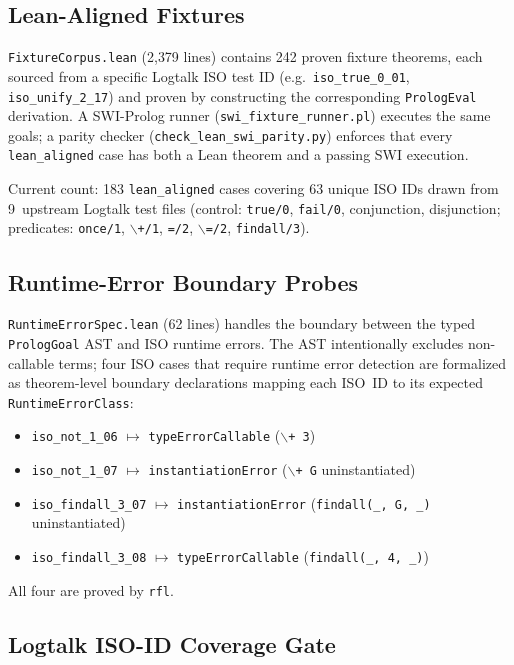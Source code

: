 \documentclass[]{article}
\newcommand{\code}[1]{\texttt{#1}}
\begin{document}
\subsection{Lean-Aligned Fixtures}

\code{FixtureCorpus.lean} (2{,}379 lines) contains 242 proven fixture
theorems, each sourced from a specific Logtalk ISO test ID
(e.g.\ \code{iso\_true\_0\_01}, \code{iso\_unify\_2\_17}) and proven
by constructing the corresponding \code{PrologEval} derivation.
A SWI-Prolog runner (\code{swi\_fixture\_runner.pl}) executes the same
goals; a parity checker (\code{check\_lean\_swi\_parity.py}) enforces
that every \code{lean\_aligned} case has both a Lean theorem and a
passing SWI execution.

Current count: 183 \code{lean\_aligned} cases covering 63 unique ISO IDs
drawn from 9~upstream Logtalk test files (control: \code{true/0},
\code{fail/0}, conjunction, disjunction; predicates: \code{once/1},
\code{$\backslash$+/1}, \code{=/2}, \code{$\backslash$=/2},
\code{findall/3}).

\subsection{Runtime-Error Boundary Probes}

\code{RuntimeErrorSpec.lean} (62 lines) handles the boundary between
the typed \code{PrologGoal} AST and ISO runtime errors.  The AST
intentionally excludes non-callable terms; four ISO cases that require
runtime error detection are formalized as theorem-level boundary
declarations mapping each ISO~ID to its expected
\code{RuntimeErrorClass}:

\begin{itemize}
\item \code{iso\_not\_1\_06} $\mapsto$ \code{typeErrorCallable} (\code{$\backslash$+ 3})
\item \code{iso\_not\_1\_07} $\mapsto$ \code{instantiationError} (\code{$\backslash$+ G} uninstantiated)
\item \code{iso\_findall\_3\_07} $\mapsto$ \code{instantiationError} (\code{findall(\_, G, \_)} uninstantiated)
\item \code{iso\_findall\_3\_08} $\mapsto$ \code{typeErrorCallable} (\code{findall(\_, 4, \_)})
\end{itemize}

\noindent
All four are proved by \code{rfl}.

\subsection{Logtalk ISO-ID Coverage Gate}
\end{document}
